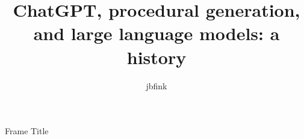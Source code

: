 \documentclass{beamer}
\title{ChatGPT, procedural generation, and large language models: a history}
\author{jbfink}
\begin{document}
\begin{frame}
    \maketitle
\end{frame}
\begin{frame}{Frame Title}
\end{frame}
\end{document}
